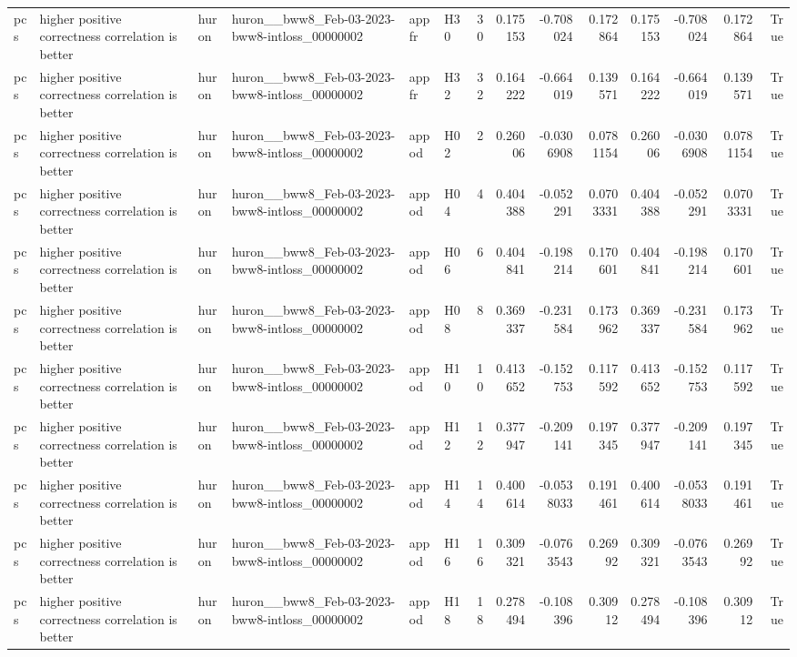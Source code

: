 \begin{longtable}{llllllrrrrrrrr}
pcs & higher positive correctness correlation is better & huron & huron\_\_bww8\_Feb-03-2023-bww8-intloss\_00000002 & appfr & H30 & 30 & 0.175153 & -0.708024 & 0.172864 & 0.175153 & -0.708024 & 0.172864 & True \\
pcs & higher positive correctness correlation is better & huron & huron\_\_bww8\_Feb-03-2023-bww8-intloss\_00000002 & appfr & H32 & 32 & 0.164222 & -0.664019 & 0.139571 & 0.164222 & -0.664019 & 0.139571 & True \\
pcs & higher positive correctness correlation is better & huron & huron\_\_bww8\_Feb-03-2023-bww8-intloss\_00000002 & appod & H02 & 2 & 0.26006 & -0.0306908 & 0.0781154 & 0.26006 & -0.0306908 & 0.0781154 & True \\
pcs & higher positive correctness correlation is better & huron & huron\_\_bww8\_Feb-03-2023-bww8-intloss\_00000002 & appod & H04 & 4 & 0.404388 & -0.052291 & 0.0703331 & 0.404388 & -0.052291 & 0.0703331 & True \\
pcs & higher positive correctness correlation is better & huron & huron\_\_bww8\_Feb-03-2023-bww8-intloss\_00000002 & appod & H06 & 6 & 0.404841 & -0.198214 & 0.170601 & 0.404841 & -0.198214 & 0.170601 & True \\
pcs & higher positive correctness correlation is better & huron & huron\_\_bww8\_Feb-03-2023-bww8-intloss\_00000002 & appod & H08 & 8 & 0.369337 & -0.231584 & 0.173962 & 0.369337 & -0.231584 & 0.173962 & True \\
pcs & higher positive correctness correlation is better & huron & huron\_\_bww8\_Feb-03-2023-bww8-intloss\_00000002 & appod & H10 & 10 & 0.413652 & -0.152753 & 0.117592 & 0.413652 & -0.152753 & 0.117592 & True \\
pcs & higher positive correctness correlation is better & huron & huron\_\_bww8\_Feb-03-2023-bww8-intloss\_00000002 & appod & H12 & 12 & 0.377947 & -0.209141 & 0.197345 & 0.377947 & -0.209141 & 0.197345 & True \\
pcs & higher positive correctness correlation is better & huron & huron\_\_bww8\_Feb-03-2023-bww8-intloss\_00000002 & appod & H14 & 14 & 0.400614 & -0.0538033 & 0.191461 & 0.400614 & -0.0538033 & 0.191461 & True \\
pcs & higher positive correctness correlation is better & huron & huron\_\_bww8\_Feb-03-2023-bww8-intloss\_00000002 & appod & H16 & 16 & 0.309321 & -0.0763543 & 0.26992 & 0.309321 & -0.0763543 & 0.26992 & True \\
pcs & higher positive correctness correlation is better & huron & huron\_\_bww8\_Feb-03-2023-bww8-intloss\_00000002 & appod & H18 & 18 & 0.278494 & -0.108396 & 0.30912 & 0.278494 & -0.108396 & 0.30912 & True \\

\end{longtable}
